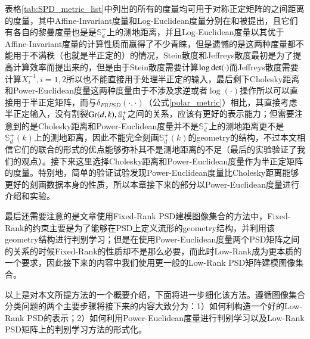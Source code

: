 表格\ref{tab:SPD_metric_list}中列出的所有的度量均可用于对称正定矩阵的之间距离的度量，其中Affine-Invariant度量和Log-Euclidean度量分别在\cite{AIM_metric}和\cite{LEM_metric}被提出，且它们有各自的黎曼度量也是是$\mathbb{S}_{d}^{+}$上的测地距离，并且Log-Euclidean度量以其优于Affine-Invariant度量的计算性质而赢得了不少青睐，但是遗憾的是这两种度量都不能用于不满秩（也就是半正定的）的情况，Stein散度\cite{Stein_divergence}和Jeffreys散度\cite{Jeffreys_divergence}最初是为了提高计算效率而提出来的，但是由于Stein散度需要计算$\log {\rm det}(\cdot)$而Jeffreys散度需要计算$X_{i}^{-1},i=1,2$所以也不能直接用于处理半正定的输入，最后剩下Cholesky距离\cite{Cholesky_distance}和Power-Euclidean度量\cite{Cholesky_distance}这两种度量由于不涉及求逆或者$\log(\cdot)$操作所以可以直接用于半正定矩阵，而与$\delta_{FRPSD}(\cdot,\cdot)$（公式\ref{polar_metric}）相比，其直接考虑半正定输入，没有割裂${\rm Gr}(d,k),\mathbb{S}_{k}^{+}$之间的关系，应该有更好的表示能力；但需要注意到的是Cholesky距离和Power-Euclidean度量并不是$\mathbb{S}_{d}^{+}$上的测地距离更不是$\mathbb{S}_{d}^{+}(k)$上的测地距离，因此不能完全刻画$\mathbb{S}_{d}^{+}(k)$的geometry的结构，不过本文相信它们的联合的形式的优点能够弥补其不是测地距离的不足（最后的实验验证了我们的观点）。接下来这里选择Cholesky距离和Power-Euclidean度量作为半正定矩阵的度量。特别地，简单的验证试验发现Power-Euclidean度量比Cholesky距离能够更好的刻画数据本身的性质，所以本章接下来的部分以Power-Euclidean度量进行介绍和实验。

最后还需要注意的是文章\cite{PSD_WACV}使用Fixed-Rank PSD建模图像集合的方法中，Fixed-Rank的约束主要是为了能够在PSD上定义流形的geometry结构，并利用该geometry结构进行判别学习；但是在使用Power-Euclidean度量两个PSD矩阵之间的关系的时候Fixed-Rank的性质却不是那么必要，而此时Low-Rank成为更本质的一个要求，因此接下来的内容中我们使用更一般的Low-Rank PSD矩阵建模图像集合。

以上是对本文所提方法的一个概要介绍，下面将进一步细化该方法。遵循图像集合分类问题的两个主要步骤将接下来的内容大致分为：1）如何利构造一个好的Low-Rank PSD的表示；2）如何利用Power-Euclidean度量进行判别学习以及Low-Rank PSD矩阵上的判别学习方法的形式化。
